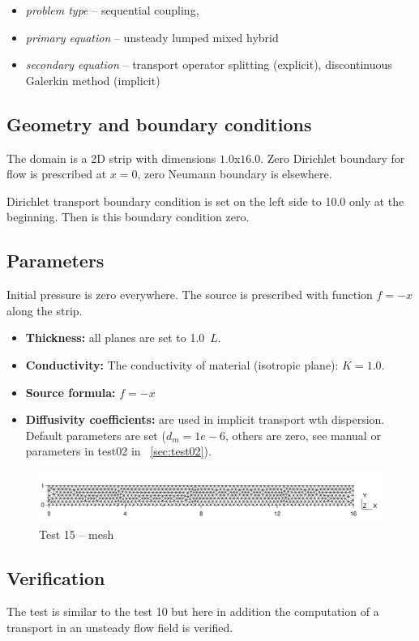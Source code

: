 \begin{itemize} 
    \item \emph{problem type} -- sequential coupling, 
    \item \emph{primary equation} -- unsteady lumped mixed hybrid
    \item \emph{secondary equation} -- transport operator splitting (explicit), discontinuous Galerkin method (implicit)
  \end{itemize}

\subsection*{Geometry and boundary conditions}
The domain is a 2D strip with dimensions $1.0$x$16.0$. Zero Dirichlet boundary for flow is prescribed at $x=0$, zero Neumann boundary is elsewhere. 

Dirichlet transport boundary condition is set on the left side to 10.0 only at the beginning. Then is this boundary condition zero.

\subsection*{Parameters}
Initial pressure is zero everywhere. 
The source is prescribed with function $f=-x$ along the strip.
%
\begin{itemize}
  \item \textbf{Thickness:} all planes are set to 1.0~$L$.
  \item \textbf{Conductivity:} The conductivity of material (isotropic plane): $K=1.0$.
  \item \textbf{Source formula:} $f = -x$
  \item \textbf{Diffusivity coefficients:} are used in implicit transport wth dispersion. 
	Default parameters are set ($d_m=1e-6$, others are zero, see manual or parameters in test02 in ~\ref{sec:test02}).
\end{itemize}
%
\begin{figure}[htb!]
\centering
\includegraphics[width=15cm]{tests_graphics/15_mesh.pdf}
\caption{Test 15 -- mesh}
\label{fig:test15_mesh}
\end{figure}
%
%
\subsection*{Verification}
The test is similar to the test 10 but here in addition the computation of a transport in an unsteady flow field is verified.


